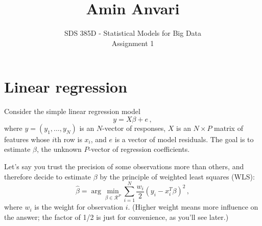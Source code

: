 \documentclass{article}
\title{Amin Anvari}
\date{}
\author{SDS 385D - Statistical Models for Big Data\\ Assignment 1}
\date{}  %
\begin{document}
\maketitle

\section{Linear regression}

Consider the simple linear regression model
$$
y = X \beta + e \, ,
$$
where $y = (y_1, \ldots, y_N)$ is an $N$-vector of responses, $X$ is an $N \times P$ matrix of features whose $i$th row is $x_i$, and $e$ is a vector of model residuals.  The goal is to estimate $\beta$, the unknown $P$-vector of regression coefficients.  

Let's say you trust the precision of some observations more than others, and therefore decide to estimate $\beta$ by the principle of weighted least squares (WLS):
$$
\hat{\beta} = \arg \min_{\beta \in \mathcal{R}^P} \sum_{i=1}^N \frac{w_i}{2}(y_i - x_i^T \beta)^2 \, ,
$$
where $w_i$ is the weight for observation $i$.  (Higher weight means more influence on the answer; the factor of 1/2 is just for convenience, as you'll see later.)
\end{document}

